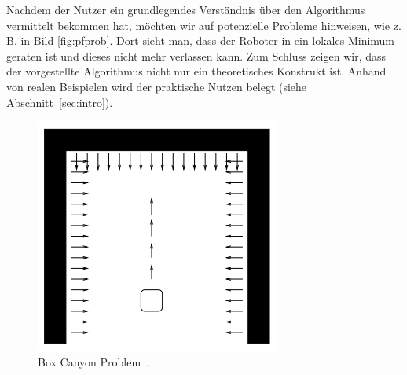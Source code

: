 Nachdem der Nutzer ein grundlegendes Verständnis über den Algorithmus vermittelt bekommen hat, möchten wir auf potenzielle Probleme hinweisen, wie z. B. in Bild \vref{fig:pfprob}. Dort sieht man, dass der Roboter in ein lokales Minimum geraten ist und dieses nicht mehr verlassen kann. Zum Schluss zeigen wir, dass der vorgestellte Algorithmus nicht nur ein theoretisches Konstrukt ist. Anhand von realen Beispielen wird der praktische Nutzen belegt (siehe Abschnitt~\vref{sec:intro}).%

\begin{figure}[ht!]
  \centering
  \includegraphics[width=0.7\linewidth, height=0.7\linewidth]{img/pfprob}
  \caption{Box Canyon Problem~\cite{Goodrich2002PotentialFT}.}
  \label{fig:pfprob}
\end{figure}





